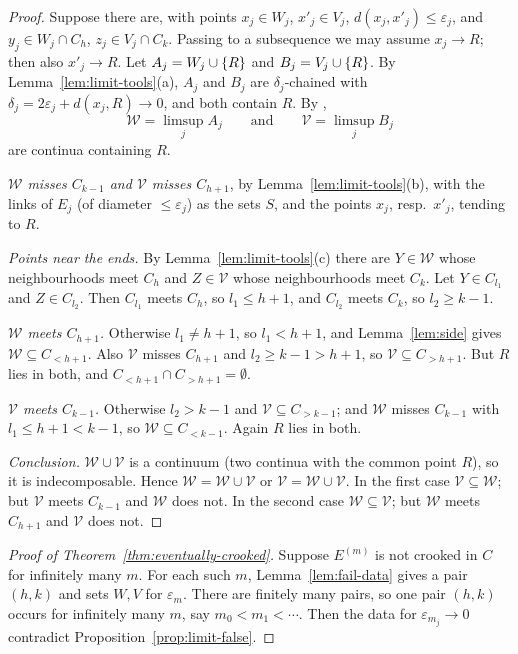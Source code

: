 \begin{proof}
Suppose there are, with points $x_j\in W_j$, $x'_j\in V_j$, $d(x_j,x'_j)\le\varepsilon_j$, and $y_j\in W_j\cap C_h$, $z_j\in V_j\cap C_k$.
Passing to a subsequence we may assume $x_j\to R$; then also $x'_j\to R$. Let $A_j=W_j\cup\left\{ R \right\}$ and $B_j=V_j\cup\left\{ R \right\}$. By
Lemma~\ref{lem:limit-tools}(a), $A_j$ and $B_j$ are $\delta_j$-chained with $\delta_j=2\varepsilon_j+d(x_j,R)\to0$, and both contain $R$. By
,
\[
\mathcal W=\limsup_jA_j\qquad\text{and}\qquad\mathcal V=\limsup_jB_j
\]
are continua containing $R$.

\emph{$\mathcal W$ misses $C_{k-1}$ and $\mathcal V$ misses $C_{h+1}$}, by Lemma~\ref{lem:limit-tools}(b), with the links of $E_j$ (of diameter
$\le\varepsilon_j$) as the sets $S$, and the points $x_j$, resp.\ $x'_j$, tending to $R$.

\emph{Points near the ends.} By Lemma~\ref{lem:limit-tools}(c) there are $Y\in\mathcal W$ whose neighbourhoods meet $C_h$ and $Z\in\mathcal V$
whose neighbourhoods meet $C_k$. Let $Y\in C_{l_1}$ and $Z\in C_{l_2}$. Then $C_{l_1}$ meets $C_h$, so $l_1\le h+1$, and $C_{l_2}$ meets
$C_k$, so $l_2\ge k-1$.

\emph{$\mathcal W$ meets $C_{h+1}$.} Otherwise $l_1\ne h+1$, so $l_1<h+1$, and Lemma~\ref{lem:side} gives $\mathcal W\subseteq C_{<h+1}$. Also $\mathcal
V$ misses $C_{h+1}$ and $l_2\ge k-1>h+1$, so $\mathcal V\subseteq C_{>h+1}$. But $R$ lies in both, and $C_{<h+1}\cap C_{>h+1}=\emptyset$.

\emph{$\mathcal V$ meets $C_{k-1}$.} Otherwise $l_2>k-1$ and $\mathcal V\subseteq C_{>k-1}$; and $\mathcal W$ misses $C_{k-1}$ with $l_1\le h+1<k-1$, so
$\mathcal W\subseteq C_{<k-1}$. Again $R$ lies in both.

\emph{Conclusion.} $\mathcal W\cup\mathcal V$ is a continuum (two continua with the common point $R$), so it is indecomposable. Hence
$\mathcal W=\mathcal W\cup\mathcal V$ or $\mathcal V=\mathcal W\cup\mathcal V$. In the first case $\mathcal V\subseteq\mathcal W$; but $\mathcal V$ meets
$C_{k-1}$ and $\mathcal W$ does not. In the second case $\mathcal W\subseteq\mathcal V$; but $\mathcal W$ meets $C_{h+1}$ and $\mathcal V$ does not.
\end{proof}


\begin{proof}[Proof of Theorem~\ref{thm:eventually-crooked}]
Suppose $E^{(m)}$ is not crooked in $C$ for infinitely many $m$. For each such $m$, Lemma~\ref{lem:fail-data} gives a pair $(h,k)$ and sets
$W,V$ for $\varepsilon_m$. There are finitely many pairs, so one pair $(h,k)$ occurs for infinitely many $m$, say $m_0<m_1<\cdots$. Then
the data for $\varepsilon_{m_j}\to0$ contradict Proposition~\ref{prop:limit-false}.
\end{proof}

